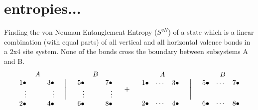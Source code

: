\documentclass[10pt]{article}
\begin{document}
\section*{entropies...}
Finding the von Neuman Entanglement Entropy ($S^{vN}$) of a state which is a linear combination (with equal parts) of all vertical and all horizontal valence bonds in a 2x4 site system.
None of the bonds cross the boundary between subsystems A and B. 
\begin{eqnarray*}
			\begin{array}{rrr}
			&A&\\
			1\bullet&\quad&3\bullet\\
			\vdots&&\vdots\\
			2\bullet&&4\bullet
			\end {array} \quad \Biggl\lvert\quad
			\begin{array}{rrr}
			&B&\\
			5\bullet&\quad&7\bullet\\
			\vdots&&\vdots\\
			6\bullet&&8\bullet
			\end {array} \quad + \quad
			\begin{array}{rrr}
			&A&\\
			1\bullet&\cdots&3\bullet\\
			&&\\ \noalign{\medskip}
			2\bullet&\cdots&4\bullet
			\end {array} \quad \Biggl\lvert\quad
			\begin{array}{rrr}
			&B&\\
			5\bullet&\cdots&7\bullet\\
			&&\\ \noalign{\medskip}
			6\bullet&\cdots&8\bullet
			\end {array} 
\end{eqnarray*}
\end{document}
